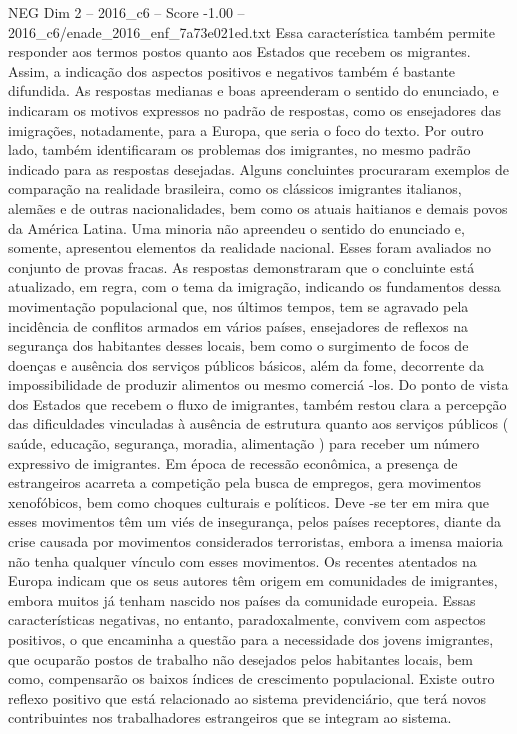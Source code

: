 \begin{textsample}{NEG Dim 2 – 2016\_c6 – Score -1.00 – 2016\_c6/enade\_2016\_enf\_7a73e021ed.txt}
Essa característica também permite responder aos termos postos quanto aos Estados que recebem os migrantes.
Assim, a indicação dos aspectos positivos e negativos também é bastante difundida.
As respostas medianas e boas apreenderam o sentido do enunciado, e indicaram os motivos expressos no padrão de respostas, como os ensejadores das imigrações, notadamente, para a Europa, que seria o foco do texto.
Por outro lado, também identificaram os problemas dos imigrantes, no mesmo padrão indicado para as respostas desejadas.
Alguns concluintes procuraram exemplos de comparação na realidade brasileira, como os clássicos imigrantes italianos, alemães e de outras nacionalidades, bem como os atuais haitianos e demais povos da América Latina.
Uma minoria não apreendeu o sentido do enunciado e, somente, apresentou elementos da realidade nacional.
Esses foram avaliados no conjunto de provas fracas.
As respostas demonstraram que o concluinte está atualizado, em regra, com o tema da imigração, indicando os fundamentos dessa movimentação populacional que, nos últimos tempos, tem se agravado pela incidência de conflitos armados em vários países, ensejadores de reflexos na segurança dos habitantes desses locais, bem como o surgimento de focos de doenças e ausência dos serviços públicos básicos, além da fome, decorrente da impossibilidade de produzir alimentos ou mesmo comerciá -los.
Do ponto de vista dos Estados que recebem o fluxo de imigrantes, também restou clara a percepção das dificuldades vinculadas à ausência de estrutura quanto aos serviços públicos ( saúde, educação, segurança, moradia, alimentação ) para receber um número expressivo de imigrantes.
Em época de recessão econômica, a presença de estrangeiros acarreta a competição pela busca de empregos, gera movimentos xenofóbicos, bem como choques culturais e políticos.
Deve -se ter em mira que esses movimentos têm um viés de insegurança, pelos países receptores, diante da crise causada por movimentos considerados terroristas, embora a imensa maioria não tenha qualquer vínculo com esses movimentos.
Os recentes atentados na Europa indicam que os seus autores têm origem em comunidades de imigrantes, embora muitos já tenham nascido nos países da comunidade europeia.
Essas características negativas, no entanto, paradoxalmente, convivem com aspectos positivos, o que encaminha a questão para a necessidade dos jovens imigrantes, que ocuparão postos de trabalho não desejados pelos habitantes locais, bem como, compensarão os baixos índices de crescimento populacional.
Existe outro reflexo positivo que está relacionado ao sistema previdenciário, que terá novos contribuintes nos trabalhadores estrangeiros que se integram ao sistema.

\end{textsample}
